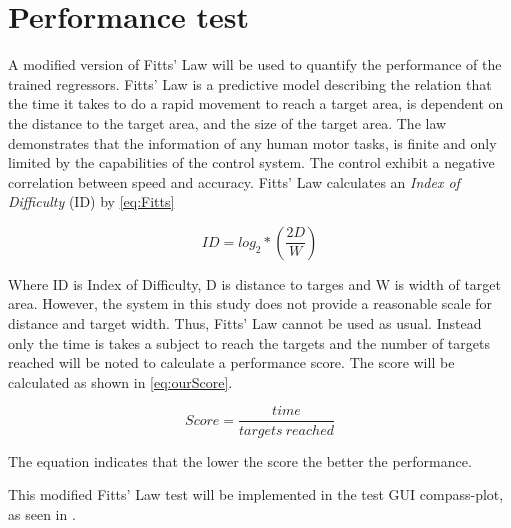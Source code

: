 \section{Performance test}

A modified version of Fitts' Law will be used to quantify the performance of the trained regressors. Fitts' Law is a predictive model describing the relation that the time it takes to do a rapid movement to reach a target area, is dependent on the distance to the target area, and the size of the target area. The law demonstrates that the information of any human motor tasks, is finite and only limited by the capabilities of the control system. The control exhibit a negative correlation between speed and accuracy. \cite{Kamavuako2014}
Fitts' Law calculates an \textit{Index of Difficulty} (ID) by \eqref{eq:Fitts}

\begin{equation} \label{eq:Fitts}
ID = log_{2} * (\frac{2D}{W})
\end{equation}

Where ID is Index of Difficulty, D is distance to targes and W is width of target area. However, the system in this study does not provide a reasonable scale for distance and target width. Thus, Fitts' Law cannot be used as usual. Instead only the time is takes a subject to reach the targets and the number of targets reached will be noted to calculate a performance score. The score will be calculated as shown in \eqref{eq:ourScore}.

\begin{equation} \label{eq:ourScore}
	Score = \frac{time}{targets\ reached}
\end{equation}

The equation indicates that the lower the score the better the performance.

This modified Fitts' Law test will be implemented in the test GUI compass-plot, as seen in . 

